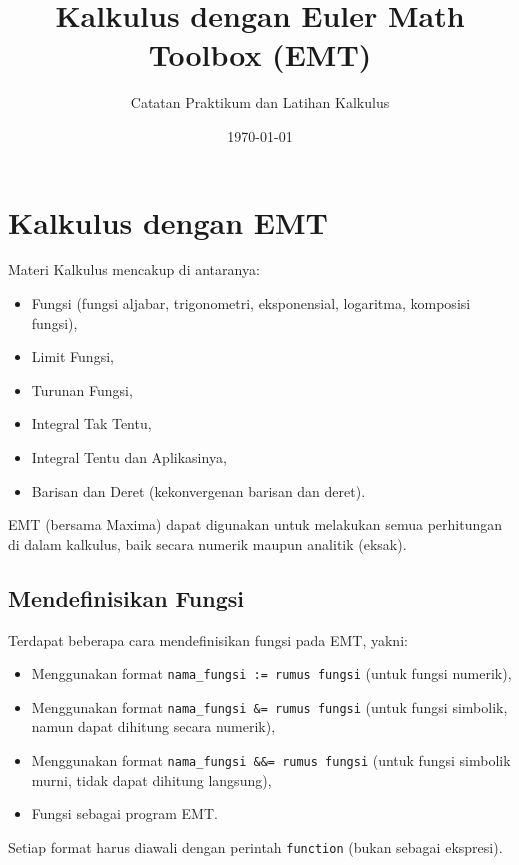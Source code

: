 \documentclass[a4paper,11pt,oneside,enabledeprecatedfontcommands]{scrbook}
\title{\textbf{Kalkulus dengan Euler Math Toolbox (EMT)}}
\author{Catatan Praktikum dan Latihan Kalkulus}
\date{\today}
\newenvironment{eulernotebook}{}{}
\newcommand{\eulerheading}[1]{\chapter{#1}}
\newcommand{\eulersubheading}[1]{\section{#1}}
\newenvironment{eulercomment}{\par\medskip\noindent}{\par\medskip}
\begin{document}
\frontmatter
\maketitle
\tableofcontents

\mainmatter
\begin{eulernotebook}

\eulerheading{Kalkulus dengan EMT}
\begin{eulercomment}
Materi Kalkulus mencakup di antaranya:
\begin{itemize}
    \item Fungsi (fungsi aljabar, trigonometri, eksponensial, logaritma, komposisi fungsi),
    \item Limit Fungsi,
    \item Turunan Fungsi,
    \item Integral Tak Tentu,
    \item Integral Tentu dan Aplikasinya,
    \item Barisan dan Deret (kekonvergenan barisan dan deret).
\end{itemize}

EMT (bersama Maxima) dapat digunakan untuk melakukan semua perhitungan di dalam kalkulus, baik secara numerik maupun analitik (eksak).
\end{eulercomment}

\eulersubheading{Mendefinisikan Fungsi}
\begin{eulercomment}
Terdapat beberapa cara mendefinisikan fungsi pada EMT, yakni:
\begin{itemize}
    \item Menggunakan format \texttt{nama\_fungsi := rumus fungsi} (untuk fungsi numerik),
    \item Menggunakan format \texttt{nama\_fungsi \&= rumus fungsi} (untuk fungsi simbolik, namun dapat dihitung secara numerik),
    \item Menggunakan format \texttt{nama\_fungsi \&\&= rumus fungsi} (untuk fungsi simbolik murni, tidak dapat dihitung langsung),
    \item Fungsi sebagai program EMT.
\end{itemize}

Setiap format harus diawali dengan perintah \texttt{function} (bukan sebagai ekspresi).


\end{eulercomment}
\end{eulernotebook}
\end{document}
